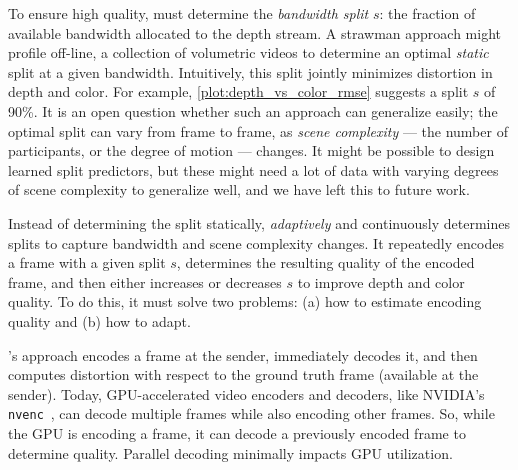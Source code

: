 To ensure high quality, \livo{} must determine the \textit{bandwidth split} $s$: the fraction of available bandwidth allocated to the depth stream.
%
A strawman approach might profile off-line, a collection of volumetric videos to determine an optimal \textit{static} split at a given bandwidth.
%
Intuitively, this split jointly minimizes distortion in depth and color.
%
For example, \cref{plot:depth_vs_color_rmse} suggests a split $s$ of 90\%.
%
It is an open question whether such an approach can generalize easily; the optimal split can vary from frame to frame, as \textit{scene complexity} --- the number of participants, or the degree of motion --- changes.
%
%
It might be possible to design learned split predictors, but these might need a lot of data with varying degrees of scene complexity to generalize well, and we have left this to future work.


%
Instead of determining the split statically, \livo{} \textit{adaptively} and continuously determines splits to capture bandwidth and scene complexity changes.
%
It repeatedly encodes a frame with a given split $s$, determines the resulting quality of the encoded frame, and then either increases or decreases $s$ to improve depth and color quality.
%
To do this, it must solve two problems: (a) how to estimate encoding quality and (b) how to adapt.

%
\livo{}'s approach encodes a frame at the sender, immediately decodes it, and then computes distortion with respect to the ground truth frame (available at the sender).
%
Today, GPU-accelerated video encoders and decoders, like NVIDIA's \texttt{nvenc}~\cite{nvenc-sdk}, can decode multiple frames while also encoding other frames.
%
So, while the GPU is encoding a frame, it can decode a previously encoded frame to determine quality.
%
Parallel decoding minimally impacts GPU utilization.
%

